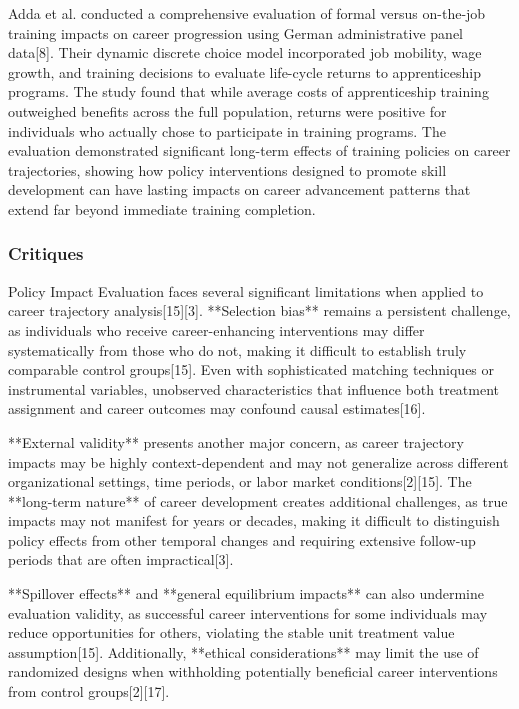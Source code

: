 \documentclass[main.tex]{subfiles}
\begin{document}

Adda et al. conducted a comprehensive evaluation of formal versus on-the-job training impacts on career progression using German administrative panel data[8]. Their dynamic discrete choice model incorporated job mobility, wage growth, and training decisions to evaluate life-cycle returns to apprenticeship programs. The study found that while average costs of apprenticeship training outweighed benefits across the full population, returns were positive for individuals who actually chose to participate in training programs. The evaluation demonstrated significant long-term effects of training policies on career trajectories, showing how policy interventions designed to promote skill development can have lasting impacts on career advancement patterns that extend far beyond immediate training completion.

\subsubsection{Critiques}

Policy Impact Evaluation faces several significant limitations when applied to career trajectory analysis[15][3]. **Selection bias** remains a persistent challenge, as individuals who receive career-enhancing interventions may differ systematically from those who do not, making it difficult to establish truly comparable control groups[15]. Even with sophisticated matching techniques or instrumental variables, unobserved characteristics that influence both treatment assignment and career outcomes may confound causal estimates[16].

**External validity** presents another major concern, as career trajectory impacts may be highly context-dependent and may not generalize across different organizational settings, time periods, or labor market conditions[2][15]. The **long-term nature** of career development creates additional challenges, as true impacts may not manifest for years or decades, making it difficult to distinguish policy effects from other temporal changes and requiring extensive follow-up periods that are often impractical[3].

**Spillover effects** and **general equilibrium impacts** can also undermine evaluation validity, as successful career interventions for some individuals may reduce opportunities for others, violating the stable unit treatment value assumption[15]. Additionally, **ethical considerations** may limit the use of randomized designs when withholding potentially beneficial career interventions from control groups[2][17].
\end{document}

